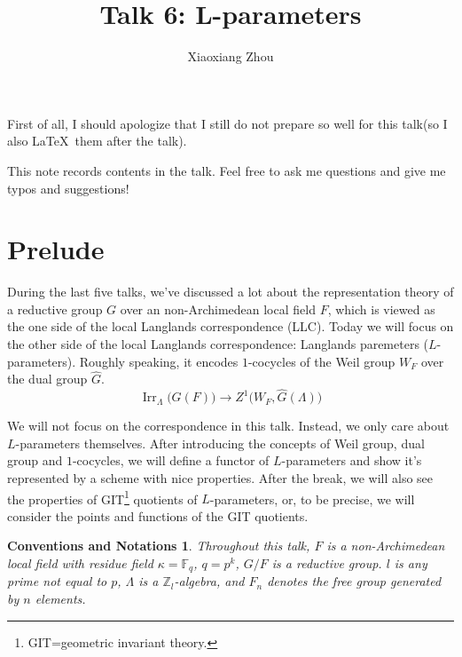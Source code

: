 \documentclass[reqno,11pt]{amsart}
\numberwithin{equation}{section}
\theoremstyle{plain}
\newtheorem*{notation}{Conventions and Notations}
\theoremstyle{plain}
\numberwithin{equation}{section}
\theoremstyle{remark}
\newcommand{\Irr}{\operatorname{Irr}}
\begin{document}
\date{}

\title
{Talk 6: L-parameters
}


\author{Xiaoxiang Zhou}
\address{School of Mathematical Sciences\\
University of Bonn\\
Bonn, 53115\\ Germany\\} 



\setcounter{tocdepth}{1}
\maketitle
\tableofcontents

First of all, I should apologize that I still do not prepare so well for this talk(so I also \LaTeX$\,$ them after the talk). 

This note records contents in the talk. Feel free to ask me questions and give me typos and suggestions!


\section{Prelude}
During the last five talks, we've discussed a lot about the representation theory of a reductive group $G$ over an non-Archimedean local field $F$, which is viewed as the one side of the local Langlands correspondence (LLC). Today we will focus on the other side of the local Langlands correspondence: Langlands paremeters ($L$-parameters). Roughly speaking, it encodes $1$-cocycles of the Weil group $W_F$ over the dual group $\hat{G}$.
$$\Irr_{\Lambda}\!\big(G(F)\big) \longrightarrow Z^1\big(W_F,\hat{G}(\Lambda)\big)$$

We will not focus on the correspondence in this talk. Instead, we only care about $L$-parameters themselves. After introducing the concepts of Weil group, dual group and $1$-cocycles, we will define a functor of $L$-parameters and show it's represented by a scheme with nice properties. After the break, we will also see the properties of GIT\footnote{GIT=geometric invariant theory.} quotients of $L$-parameters, or, to be precise, we will consider the points and functions of the GIT quotients.

\begin{notation}
Throughout this talk, $F$ is a non-Archimedean local field with residue field $\kappa=\mathbb{F}_q$, $q=p^k$, $G/F$ is a reductive group. $l$ is any prime not equal to $p$, $\Lambda$ is a $\mathbb{Z}_l$-algebra, and $F_n$ denotes the free group generated by $n$ elements.
\end{notation}
\end{document}
